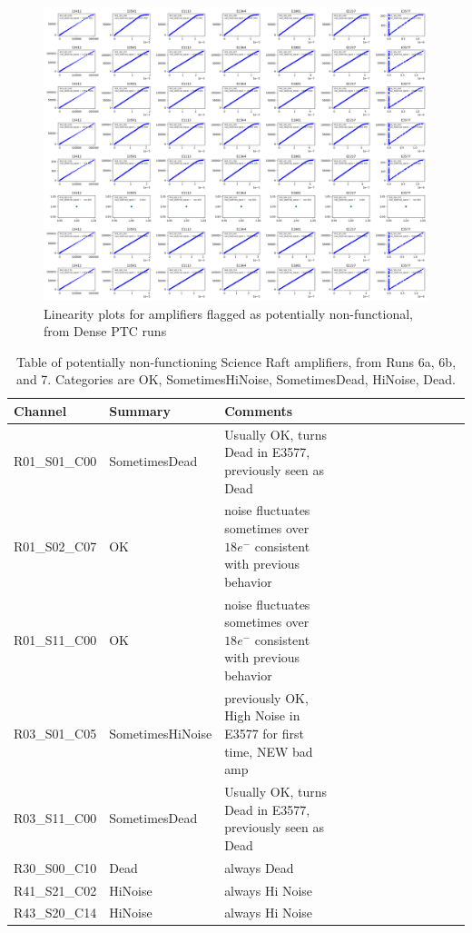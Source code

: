 \begin{figure}
    \centering
    \includegraphics[width=0.95\linewidth]{figures/lin_badamps.png}
    \caption{Linearity plots for amplifiers flagged as potentially non-functional, from Dense PTC runs}
    \label{fig:lin-badamps}
\end{figure}

\begin{table}[!ht]
    \tiny
    \centering
    \begin{tabular}{|l|l|l|l|l|l|l|l|l|l|l|l|l|}
    \hline
        Channel & Summary & Comments  \\ \hline

R01\_S01\_C00  & SometimesDead & Usually OK, turns Dead in E3577, previously seen as Dead \\ \hline
R01\_S02\_C07  & OK & noise fluctuates sometimes over $18e^-$ consistent with previous behavior \\ \hline
R01\_S11\_C00  & OK & noise fluctuates sometimes over $18e^-$ consistent with previous behavior \\ \hline
R03\_S01\_C05  & SometimesHiNoise & previously OK,  High Noise in E3577 for first time, NEW bad amp \\ \hline
R03\_S11\_C00  & SometimesDead & Usually OK, turns Dead in E3577, previously seen as Dead \\ \hline
R30\_S00\_C10  & Dead & always Dead \\ \hline
R41\_S21\_C02  & HiNoise & always Hi Noise \\ \hline
R43\_S20\_C14  & HiNoise & always Hi Noise \\ \hline

    \end{tabular}
    \caption{Table of potentially non-functioning Science Raft amplifiers, from Runs 6a, 6b, and 7. Categories are OK, SometimesHiNoise, SometimesDead, HiNoise, Dead. \label{tab:gds_amps}}
\end{table}


